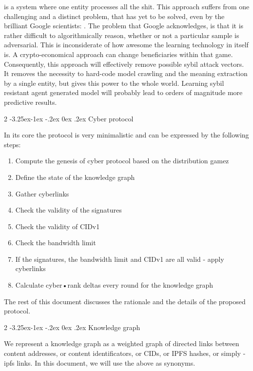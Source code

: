 \documentclass[8pt,oneside]{amsart}
\makeatletter
\newcommand{\linkgreen}[2]{\href{#1}{\color{green}{#2}}}
\renewcommand\subsection{\@startsection{subsection}
                                    {2}{\z@}
                                    {-3.25ex\@plus -1ex \@minus -.2ex}
                                    {0ex \@plus .2ex}
                                    {\play\Large}
                        }
\newcommand{\titleSection}[1]{\subsection{#1}}
\makeatother
\begin{document}
\linkgreen{https://ipfs.io/ipfs/QmeS4LjoL1iMNRGuyYSx78RAtubTT2bioSGnsvoaupcHR6}{The current architecture of search engines} is a system where one entity processes all the shit. This approach suffers from one challenging and a distinct problem, that has yet to be solved, even by the brilliant Google scientists: \linkgreen{https://ipfs.io/ipfs/QmNrAFz34SLqkzhSg4wAYYJeokfJU5hBEpkT4hPRi226y9}{the adversarial examples problem}. The problem that Google acknowledges, is that it is rather difficult to algorithmically reason, whether or not a particular sample is adversarial. This is inconsiderate of how awesome the learning technology in itself is. A crypto-economical approach can change beneficiaries within that game. Consequently, this approach will effectively remove possible sybil attack vectors. It removes the necessity to hard-code model crawling and the meaning extraction by a single entity, but gives this power to the whole world. Learning sybil resistant agent generated model will probably lead to orders of magnitude more predictive results.

\titleSection{Cyber protocol}\label{cyber-protocol}

In its core the protocol is very minimalistic and can be expressed by the following steps:

\begin{enumerate}[nosep]
\item Compute the genesis of cyber protocol based on the distribution gamez
\item Define the state of the knowledge graph
\item Gather cyberlinks
\item Check the validity of the signatures
\item Check the validity of CIDv1
\item Check the bandwidth limit
\item If the signatures, the bandwidth limit and CIDv1 are all valid - apply cyberlinks
\item Calculate cyber•rank deltas every round for the knowledge graph
\end{enumerate}

The rest of this document discusses the rationale and the details of the proposed protocol.

\titleSection{Knowledge graph}\label{knowledge-graph}

We represent a knowledge graph as a weighted graph of directed links between content addresses, or content identificators, or CIDs, or IPFS hashes, or simply - ipfs links. In this document, we will use the above as synonyms.
\end{document}
